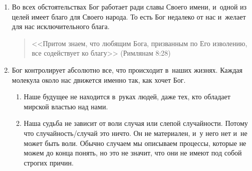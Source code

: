 \documentclass[a4paper,12pt]{article}
\begin{document}
\begin{enumerate}
\begin{itemize}
\begin{enumerate}
        \item Во всех обстоятельствах Бог работает ради славы Своего имени, и~одной из целей имеет благо для Своего народа. То есть Бог недалеко от нас и~желает для нас исключительного блага.
        \begin{quote}
        <<Притом знаем, что любящим Бога, призванным по Его изволению, все содействует ко благу>> (Римлянам 8:28)
        \end{quote}  
        \item Бог контролирует абсолютно все, что происходит в~наших жизнях. Каждая молекула около нас движется именно так, как хочет Бог.
        \begin{enumerate}
            \item Наше будущее не находится в~руках людей, даже тех, кто обладает мирской властью над нами.
            \item Наша судьба не зависит от воли случая или слепой случайности. Потому что случайность/случай это ничто. Он не материален, и~у него нет и~не может быть воли. Обычно случаем мы описываем процессы, которые не можем до конца понять, но это не значит, что они не имеют под собой строгих причин. 
            

\end{enumerate}
\end{enumerate}
\end{itemize}
\end{enumerate}
\end{document}
